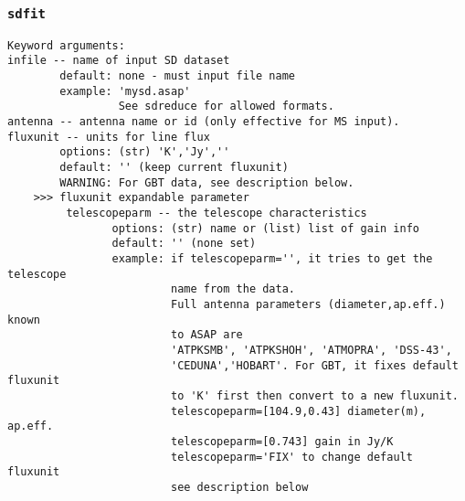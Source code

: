 \subsubsection{{\tt sdfit}}
\label{section:sd.sdtasks.tasks.sdfit}

\begin{verbatim}
Keyword arguments:
infile -- name of input SD dataset
        default: none - must input file name
        example: 'mysd.asap'
                 See sdreduce for allowed formats.
antenna -- antenna name or id (only effective for MS input). 
fluxunit -- units for line flux
        options: (str) 'K','Jy',''
        default: '' (keep current fluxunit)
        WARNING: For GBT data, see description below.
    >>> fluxunit expandable parameter
         telescopeparm -- the telescope characteristics
                options: (str) name or (list) list of gain info
                default: '' (none set)
                example: if telescopeparm='', it tries to get the telescope
                         name from the data.
                         Full antenna parameters (diameter,ap.eff.) known
                         to ASAP are
                         'ATPKSMB', 'ATPKSHOH', 'ATMOPRA', 'DSS-43',
                         'CEDUNA','HOBART'. For GBT, it fixes default fluxunit
                         to 'K' first then convert to a new fluxunit.
                         telescopeparm=[104.9,0.43] diameter(m), ap.eff.
                         telescopeparm=[0.743] gain in Jy/K
                         telescopeparm='FIX' to change default fluxunit
                         see description below


\end{verbatim}
